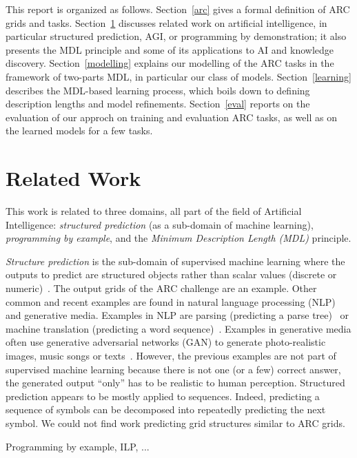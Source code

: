 \documentclass[a4paper]{llncs}
\begin{document}
This report is organized as follows. Section~\ref{arc} gives a formal
definition of ARC grids and tasks. Section~\ref{related} discusses
related work on artificial intelligence, in particular structured
prediction, AGI, or programming by demonstration; it also presents the
MDL principle and some of its applications to AI and knowledge
discovery. Section~\ref{modelling} explains our modelling of the ARC
tasks in the framework of two-parts MDL, in particular our class of
models. Section~\ref{learning} describes the MDL-based learning
process, which boils down to defining description lengths and model
refinements. Section~\ref{eval} reports on the evaluation of our
approch on training and evaluation ARC tasks, as well as on the
learned models for a few tasks.

\section{Related Work}
\label{related}

This work is related to three domains, all part of the field of
Artificial Intelligence: {\em structured prediction} (as a sub-domain
of machine learning), {\em programming by example}, and the {\em
  Minimum Description Length (MDL)} principle.

{\em Structure prediction} is the sub-domain of supervised machine
learning where the outputs to predict are structured objects rather
than scalar values (discrete or
numeric)~\cite{ReviewStructPred,dietterich2008structured}. The output
grids of the ARC challenge are an example. Other common and recent
examples are found in natural language processing (NLP) and generative
media. Examples in NLP are parsing (predicting a parse
tree)~\cite{PredParseTree} or machine translation (predicting a word
sequence)~\cite{MachTransl}. Examples in generative media often use
generative adversarial networks (GAN) to generate photo-realistic
images, music songs or texts~\cite{GAN_App}. However, the previous
examples are not part of supervised machine learning because there is
not one (or a few) correct answer, the generated output ``only'' has
to be realistic to human perception. Structured prediction appears to
be mostly applied to sequences. Indeed, predicting a sequence of
symbols can be decomposed into repeatedly predicting the next
symbol. We could not find work predicting grid structures similar to
ARC grids.


Programming by example, ILP, ...
\end{document}
